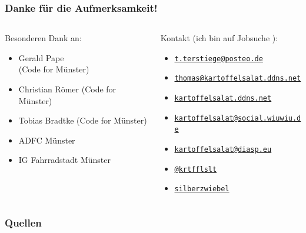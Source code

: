 \documentclass{beamer}
\begin{document}
\begin{frame}
  \frametitle{Danke für die Aufmerksamkeit!}
  
  \centering
  \begin{columns}
    \begin{column}{0.36\linewidth}
      Besonderen Dank an:  
      \begin{itemize}
        \item Gerald Pape\\(Code for Münster)
        \item Christian Römer (Code for Münster)
        \item Tobias Bradtke (Code for Münster)
        \item ADFC Münster
        \item IG Fahrradstadt Münster
      \end{itemize}
    \end{column}
    \hfill
    \begin{column}{0.6515\linewidth}
      Kontakt (ich bin auf Jobsuche \faSmileWink[regular]):
      \begin{itemize}
        \item[\faEnvelope] \href{mailto:t.terstiege@posteo.de}{\texttt{t.terstiege@posteo.de}}
        \item[\faComments] \href{xmpp:thomas@kartoffelsalat.ddns.net}{\texttt{thomas@kartoffelsalat.ddns.net}}
        \item[\faGlobe] \href{https://kartoffelsalat.ddns.net}{\texttt{kartoffelsalat.ddns.net}}
        \item[\faMastodon] \href{https://social.wiuwiu.de/@kartoffelsalat}{\texttt{kartoffelsalat@social.wiuwiu.de}}
        \item[\faDiaspora] \href{https://diasp.eu/u/kartoffelsalat}{\texttt{kartoffelsalat@diasp.eu}}
        \item[\faTwitter]  \href{https://twitter.com/krtfflslt}{\texttt{@krtfflslt}}
        \item[\faGithub]  \href{https://github.com/silberzwiebel}{\texttt{silberzwiebel}}
      \end{itemize}
    \end{column}
  \end{columns}

\end{frame}

\begin{frame}
  \frametitle{Quellen}
  \printbibliography[title=Quellen]
\end{frame}
\end{document}
